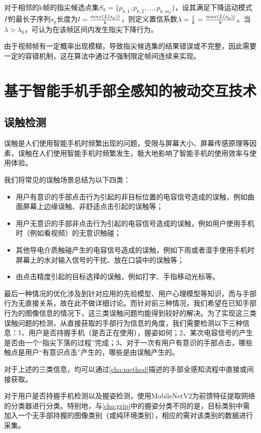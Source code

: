 对于相邻的k帧的指尖候选点集$S_k = \{p_{k,1}, p_{k,2}, ... , p_{k,m_k}\}$，设其满足下降运动模式$P$的最长子序列$s_p$长度为$l={max(L(s_p)) \over k} $，则定义置信系数$\lambda={l \over k}={max(L(s_p)) \over k}$。当$\lambda > \lambda_0$，可认为在该帧区间内发生指尖下降行为。

由于视频帧有一定概率出现模糊，导致指尖候选集的结果错误或不完整，因此需要一定的容错机制，这在算法中通过不强制限定帧间连续来实现。

\chapter{基于智能手机手部全感知的被动交互技术}

\section{误触检测}
误触是人们使用智能手机时频繁出现的问题，受限与屏幕大小、屏幕传感原理等因素，误触在人们使用智能手机时频繁发生，极大地影响了智能手机的使用效率与使用体验。

我们将常见的误触场景总结为以下四类：
\begin{itemize}
    \item 用户有意识的手部点击行为引起的非目标位置的电容信号造成的误触，例如曲面屏幕上边缘误触、非舒适点击引起的误触等；
    \item 用户无意识的手部非点击行为引起的电容信号造成的误触，例如用户使用手机时（例如看视频）的无意识触碰；
    \item 其他导电介质触碰产生的电容信号造成的误触，例如下雨或者湿手使用手机时屏幕上的水对输入信号的干扰、放在口袋中的误触等；
    \item 由点击精度引起的目标选择的误触，例如打字、手指移动光标等。
\end{itemize}

最后一种情况的优化涉及到针对应用的先验模型、用户心理模型等知识，而与手部行为无直接关系，故在此不做详细讨论。而针对前三种情况，我们希望在已知手部行为的图像信息的情况下，这三类误触问题均能得到较好的解决。为了实现这三类误触问题的检测，从直接获取的手部行为信息的角度，我们需要检测以下三种信息：1、用户是否持握手机（是否正在使用），握姿如何；2、某次电容信号的产生是否由一个“指尖下落的过程”完成；3、对于一次有用户有意识的手部点击，哪些触点是用户“有意识点击”产生的，哪些是由误触产生的。

对于上述的三类信息，均可以通过\ref{cha:method}描述的手部全感知流程中直接或间接获取。

对于用户是否持握手机检测以及握姿检测，使用MobileNetV2为前馈特征提取网络的分类器进行分类。特别地，与\ref{cha:grip}中的握姿分类不同的是，目标类别中需加入一个无手部持握的图像类别（或纯环境类别），相应的需对该类别的数据进行采集。

